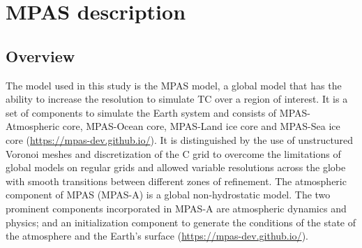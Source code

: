 \documentclass[8pt,a4paper]{article}
\begin{document}
	
	\section{MPAS description}
	
	\subsection{Overview}
	
	
	The model used in this study is the MPAS model, a global model that has the ability to increase the resolution to simulate TC over a region of interest. It is a set of components to simulate the Earth system and consists of MPAS-Atmospheric core, MPAS-Ocean core, MPAS-Land ice core and MPAS-Sea ice core (\url{https://mpas-dev.github.io/}). It is distinguished by the use of unstructured Voronoi meshes and discretization of the C grid to overcome the limitations of global models on regular grids and allowed variable resolutions across the globe with smooth transitions between different zones of refinement. 
	The atmospheric component of MPAS (MPAS-A) is a global non-hydrostatic model. The two prominent components incorporated in MPAS-A are atmospheric dynamics and physics; and an initialization component to generate the conditions of the state of the atmosphere and the Earth's surface (\url{https://mpas-dev.github.io/}). 
	
\end{document}
